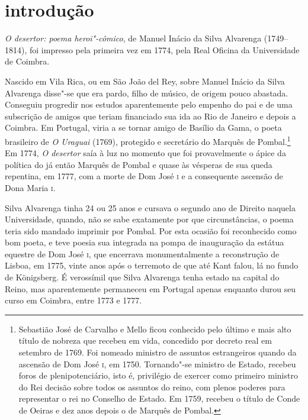 \chapter[Introdução, por Clara S. Santos e Ricardo M. Valle]{introdução}


\textit{O desertor: poema heroi"-cômico}, de Manuel Inácio
da Silva Alvarenga (1749--1814), foi impresso pela primeira
vez em 1774, pela Real Oficina da Universidade de Coimbra.

Nascido em Vila Rica, ou em São João del Rey, sobre Manuel Inácio da Silva
Alvarenga disse"-se que era pardo, filho de músico, de origem pouco abastada.
Conseguiu progredir nos estudos aparentemente pelo empenho do pai e de uma
subscrição de amigos que teriam financiado sua ida ao Rio de Janeiro e depois a
Coimbra. Em Portugal, viria a se tornar amigo de Basílio da Gama, o poeta
brasileiro de \textit{O Uraguai} (1769), protegido e secretário do Marquês de
Pombal.\footnote{  Sebastião José de Carvalho e Mello ficou conhecido pelo último
e mais alto título de nobreza que recebeu em vida, concedido por decreto real em
setembro de 1769. Foi nomeado ministro de assuntos estrangeiros quando da
ascensão de Dom José \textsc{i}, em 1750. Tornando"-se ministro de Estado,
recebeu foros de plenipotenciário, isto é, privilégio de exercer como primeiro
ministro do Rei decisão sobre todos os assuntos do reino, com plenos poderes
para representar o rei no Conselho de Estado. Em 1759, recebeu o título de Conde
de Oeiras e dez anos depois o de Marquês de Pombal. }  Em 1774, \textit{O
desertor} saía à luz no momento que foi provavelmente o ápice da política do já
então Marquês de Pombal e quase às vésperas de sua queda repentina, em 1777, com
a morte de Dom José \textsc{i} e a consequente ascensão de Dona Maria
\textsc{i}.

Silva Alvarenga tinha 24 ou 25 anos e cursava o segundo ano de Direito naquela
Universidade, quando, não se sabe exatamente por que circunstâncias, o poema
teria sido mandado imprimir por Pombal. Por esta ocasião foi reconhecido como
bom poeta, e teve poesia sua integrada na pompa de inauguração da estátua
equestre de Dom José \textsc{i}, que encerrava monumentalmente a reconstrução de
Lisboa, em 1775, vinte anos após o terremoto de que até Kant falou, lá no fundo
de K\"onigsberg.  É verossímil que Silva Alvarenga tenha estado na capital do
Reino, mas aparentemente permaneceu em Portugal apenas enquanto durou seu curso
em Coimbra, entre 1773 e 1777.

